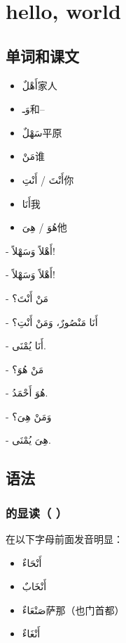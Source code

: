\chapter{hello, world}

\section{ 单词和课文}

\begin{itemize}
    \item \ac{أَهْلٌ}{家人}
    \item \ac{وَـ}{和--}
    \item \ac{سَهْلٌ}{平原}
    \item \ac{مَنْ}{谁}
    \item \ac{أَنْتَ / أَنْتِ}{你}
    \item \ac{أَنَا}{我}
    \item \ac{هُوَ / هِىَ}{他}
\end{itemize}

\begin{Arabic}
    - أَهْلاً وَسَهْلاً!

    - أَهْلاً وَسَهْلاً!

    - مَنْ أَنْتَ؟

    - أَنَا مَنْصُورٌ، وَمَنْ أَنْتِ؟

    - أَنَا يُمْنَى.

    - مَنْ هُوَ؟

    - هُوَ أَحْمَدُ.

    - وَمَنْ هِىَ؟

    - هِىَ يُمْنَى.
\end{Arabic}

\section{语法}

\subsection{  的显读（ ）}

 在以下字母前面发音明显：

\begin{itemize}
    \item \ac{أَنْحَاءٌ}{}
    \item \ac{أَنْخَابٌ}{}
    \item \ac{صَنْعَاءٌ}{萨那（也门首都）}
    \item \ac{أَنْغَاءٌ}{}
\end{itemize}

